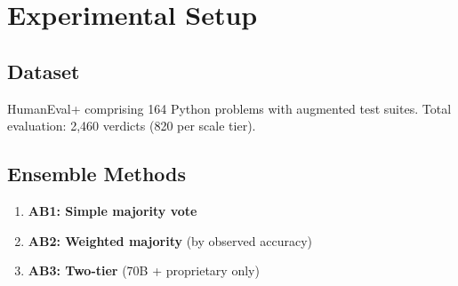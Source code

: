 \section{Experimental Setup}

\subsection{Dataset}

HumanEval+ comprising 164 Python problems with augmented test suites. Total evaluation: 2,460 verdicts (820 per scale tier).

\subsection{Ensemble Methods}

\begin{enumerate}
    \item \textbf{AB1: Simple majority vote}
    \item \textbf{AB2: Weighted majority} (by observed accuracy)
    \item \textbf{AB3: Two-tier} (70B + proprietary only)
\end{enumerate}
